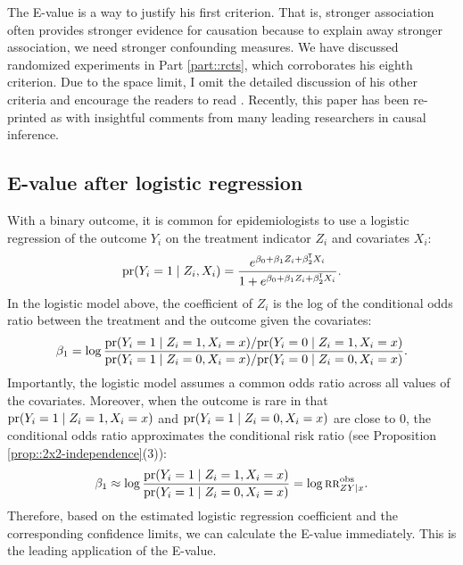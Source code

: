 The E-value is a way to justify his first criterion. 
That is, stronger association often provides stronger evidence for causation because to explain away stronger association, we need stronger confounding measures. 
We have discussed randomized experiments in Part \ref{part::rcts}, which corroborates his eighth criterion. Due to the space limit, I omit the detailed discussion of his other criteria and encourage the readers to read  \citet{hill1965environment}. Recently, this paper has been re-printed as \citet{hill2020environment} with insightful comments from many leading researchers in causal inference. 




\subsection{E-value after logistic regression}

With a binary outcome, it is common for epidemiologists to use a logistic regression of the outcome $Y_i$ on the treatment indicator $Z_i$ and covariates $X_i$:
$$
\textup{pr}(Y_i = 1\mid Z_i, X_i) = \frac{  e^{\beta_0 + \beta_1 Z_i + \beta_2^{\mkern-1.5mu\mathsf{T}} X_i}  }{1  + e^{\beta_0 + \beta_1 Z_i + \beta_2^{\mkern-1.5mu\mathsf{T}} X_i}} .
$$
In the logistic model above, the coefficient of $Z_i$ is the log of the conditional odds ratio between the treatment and the outcome given the covariates:
$$
\beta_1 = \log \frac{   \textup{pr}(Y_i=1\mid Z_i =1, X_i=x)/  \textup{pr}(Y_i=0\mid Z_i =1, X_i=x)  }
{  \textup{pr}(Y_i=1\mid Z_i =0, X_i=x)/  \textup{pr}(Y_i=0\mid Z_i =0, X_i=x)  }  .
$$
Importantly, the logistic model assumes a common odds ratio across all values of the covariates. Moreover, when the outcome is rare in that $ \textup{pr}(Y_i=1\mid Z_i =1, X_i=x)$ and $\textup{pr}(Y_i=1\mid Z_i =0, X_i=x)$ are close to $0$, the conditional odds ratio approximates the conditional risk ratio (see Proposition \ref{prop::2x2-independence}(3)):
$$
\beta_1  \approx \log  \frac{   \textup{pr}(Y_i=1\mid Z_i =1, X_i=x)  }
{  \textup{pr}(Y_i=1\mid Z_i =0, X_i=x)  } = \log   \textsc{rr}_{ZY\mid x}^{\textup{obs}}.
$$
Therefore, based on the estimated logistic regression coefficient and the corresponding confidence limits, we can calculate the E-value immediately. This is the leading application of the E-value. 




